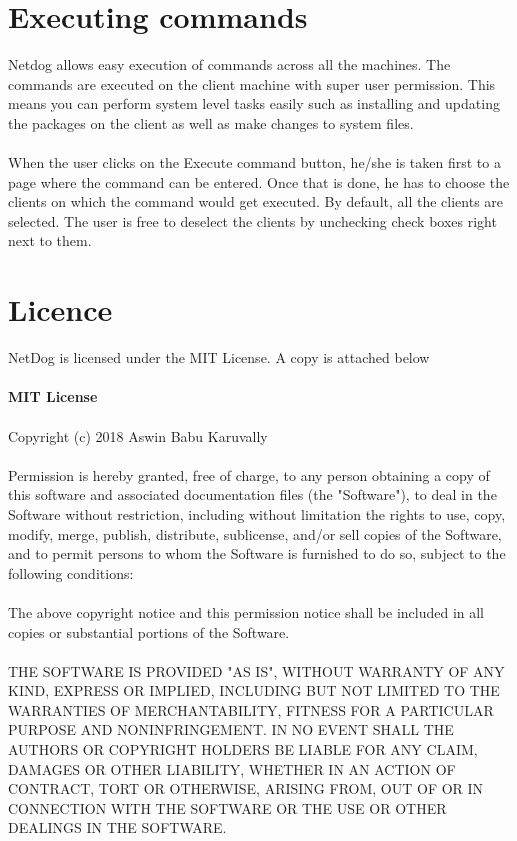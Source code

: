 \section{Executing commands}

Netdog allows easy execution of commands across all the machines. The commands
are executed on the client machine with super user permission. This means you
can perform system level tasks easily such as installing and updating the
packages on the client as well as make changes to system files.
\\\\
When the user clicks on the Execute command button, he/she is taken first to a
page where the command can be entered. Once that is done, he has to choose the
clients on which the command would get executed. By default, all the clients
are selected. The user is free to deselect the clients by unchecking check
boxes right next to them.

\newpage 

\section{Licence}
NetDog is licensed under the MIT License. A copy is attached below\\\\
\textbf{MIT License}\\\\
Copyright (c) 2018 Aswin Babu Karuvally\\\\
Permission is hereby granted, free of charge, to any person obtaining a copy
of this software and associated documentation files (the "Software"), to deal
in the Software without restriction, including without limitation the rights
to use, copy, modify, merge, publish, distribute, sublicense, and/or sell
copies of the Software, and to permit persons to whom the Software is
furnished to do so, subject to the following conditions:\\\\
The above copyright notice and this permission notice shall be included in all
copies or substantial portions of the Software.\\\\
THE SOFTWARE IS PROVIDED "AS IS", WITHOUT WARRANTY OF ANY KIND, EXPRESS OR
IMPLIED, INCLUDING BUT NOT LIMITED TO THE WARRANTIES OF MERCHANTABILITY,
FITNESS FOR A PARTICULAR PURPOSE AND NONINFRINGEMENT. IN NO EVENT SHALL THE 
AUTHORS OR COPYRIGHT HOLDERS BE LIABLE FOR ANY CLAIM, DAMAGES OR OTHER
LIABILITY, WHETHER IN AN ACTION OF CONTRACT, TORT OR OTHERWISE, ARISING FROM,
OUT OF OR IN CONNECTION WITH THE SOFTWARE OR THE USE OR OTHER DEALINGS IN THE 
SOFTWARE.

